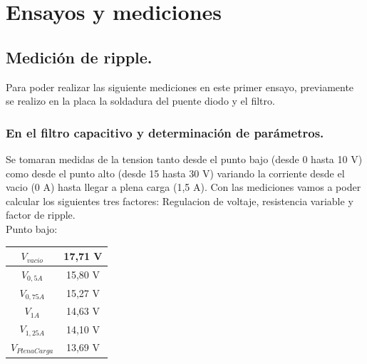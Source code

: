 \chapter{Ensayos y mediciones}

\section{Medición de ripple.}

Para poder realizar las siguiente mediciones en este primer ensayo, previamente se realizo en la placa la soldadura del puente diodo y el filtro.

\subsection{En el filtro capacitivo y determinación de parámetros.}

Se tomaran medidas de la tension tanto desde el punto bajo (desde 0 hasta 10 V) como desde el punto alto (desde 15 hasta 30 V) variando la corriente desde el vacio (0 A) hasta llegar a plena carga (1,5 A). Con las mediciones vamos a poder calcular los siguientes tres factores: Regulacion de voltaje, resistencia variable y factor de ripple.\\

Punto bajo:

\begin{table}[H]
  \centering
  \begin{tabular}{|c|c|}
    \hline
    $V_{vacio}$ & 17,71 V \\ \hline
    $V_{0,5 A}$ & 15,80 V \\ \hline
    $V_{0,75 A}$ & 15,27 V \\ \hline    
    $V_{1 A}$ & 14,63 V \\ \hline
    $V_{1,25 A}$ & 14,10 V \\ \hline
    $V_{PlenaCarga}$ & 13,69 V \\ \hline
  \end{tabular}
\end{table}


\begin{figure}[H]
  \centering
\end{figure}


